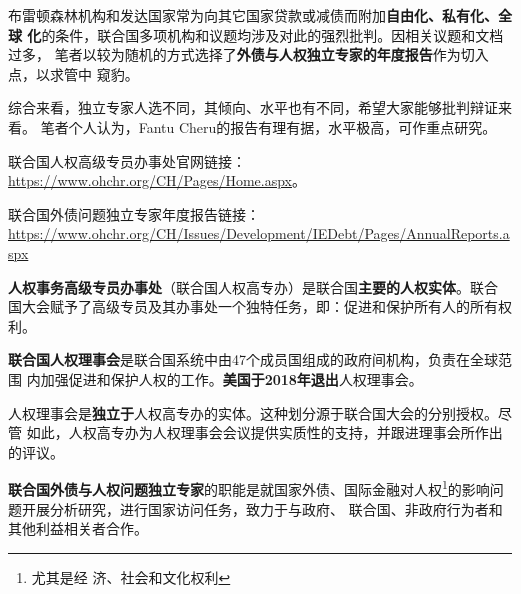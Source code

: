 布雷顿森林机构和发达国家常为向其它国家贷款或减债而附加\textbf{自由化、私有化、全球
  化}的条件，联合国多项机构和议题均涉及对此的强烈批判。因相关议题和文档过多，
笔者以较为随机的方式选择了\textbf{外债与人权独立专家的年度报告}作为切入点，以求管中
窥豹。

综合来看，独立专家人选不同，其倾向、水平也有不同，希望大家能够批判辩证来看。
笔者个人认为，Fantu Cheru的报告有理有据，水平极高，可作重点研究。

联合国人权高级专员办事处官网链接：\url{https://www.ohchr.org/CH/Pages/Home.aspx}。

联合国外债问题独立专家年度报告链接：\url{https://www.ohchr.org/CH/Issues/Development/IEDebt/Pages/AnnualReports.aspx}


\textbf{人权事务高级专员办事处}（联合国人权高专办）是联合国\textbf{主要的人权实体}。联合
国大会赋予了高级专员及其办事处一个独特任务，即：促进和保护所有人的所有权利。

\textbf{联合国人权理事会}是联合国系统中由47个成员国组成的政府间机构，负责在全球范围
内加强促进和保护人权的工作。\textbf{美国于2018年退出}人权理事会。

人权理事会是\textbf{独立于}人权高专办的实体。这种划分源于联合国大会的分别授权。尽管
如此，人权高专办为人权理事会会议提供实质性的支持，并跟进理事会所作出的评议。

\textbf{联合国外债与人权问题独立专家}的职能是就国家外债、国际金融对人权\footnote{尤其是经
  济、社会和文化权利}的影响问题开展分析研究，进行国家访问任务，致力于与政府、
联合国、非政府行为者和其他利益相关者合作。


